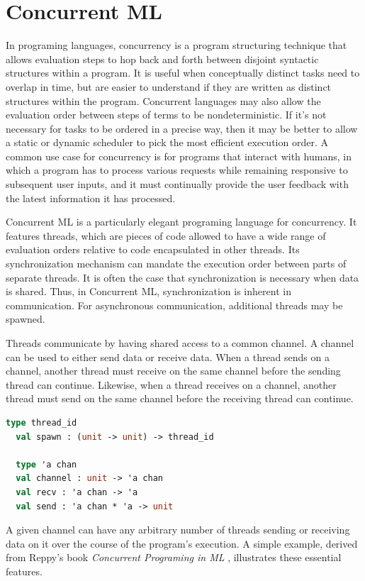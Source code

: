 \documentclass[letterpaper, 11pt]{report}
\begin{document}
\section{Concurrent ML}
In programing languages, concurrency is a program structuring technique that allows evaluation
steps to hop back and forth between disjoint syntactic structures within a program.
It is useful
when conceptually distinct tasks need to overlap in time, but are easier to understand if they
are written as distinct structures within the program. Concurrent languages may also allow the
evaluation order between steps of terms to be nondeterministic. If it's not necessary for
tasks to be ordered in a precise way, then it may be better to allow a static or dynamic
scheduler to pick the most efficient execution order. A common use case for concurrency
is for programs that interact with humans, in which a program has to process various requests
while remaining responsive to subsequent user inputs, and it must continually provide the user
feedback with the latest information it has processed.

Concurrent ML is a particularly elegant programing language for concurrency.
It features threads, which are pieces of code allowed to have a wide range of
evaluation orders relative to code encapsulated in other threads. Its synchronization
mechanism can mandate the execution order between parts of separate threads. It is often the
case that synchronization is necessary when data is shared. Thus, in Concurrent ML,
synchronization is inherent in communication. For asynchronous communication, additional threads may be spawned.

Threads communicate by having shared access to a common channel. A channel can be used to
either send data or receive data. When a thread sends on a channel, another thread must
receive on the same channel before the sending thread can continue. Likewise, when a thread
receives on a channel, another thread must send on the same channel before the receiving thread
can continue.

\begin{lstlisting}[language=ML]
  type thread_id
  val spawn : (unit -> unit) -> thread_id

  type 'a chan
  val channel : unit -> 'a chan
  val recv : 'a chan -> 'a
  val send : 'a chan * 'a -> unit
  \end{lstlisting}

A given channel can have any arbitrary number of threads sending or receiving data on it over
the course of the program's execution. A simple example, derived from Reppy's book
\textit{Concurrent Programing in ML} \cite{reppy2007concurrent}, illustrates these essential
features.
\end{document}
